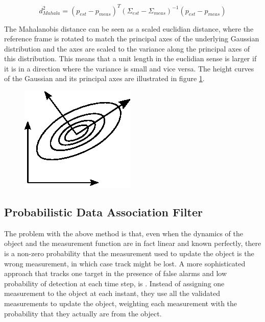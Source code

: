 \begin{equation}
    d^2_{Mahala} = (p_{est} - p_{meas})^T(\Sigma_{est} - \Sigma_{meas})^{-1}(p_{est} - p_{meas})
\end{equation}

The Mahalanobis distance can be seen as a scaled euclidian distance, where the reference frame is rotated to match the principal axes of the underlying Gaussian distribution and the axes are scaled to the variance along the principal axes of this distribution. This means that a unit length in the euclidian sense is larger if it is in a direction where the variance is small and vice versa. The height curves of the Gaussian and its principal axes are illustrated in figure \ref{Fig:GaussianPrincipalAxes}. 

\begin{figure}
    \centering
    \includegraphics[width=0.5\linewidth]{0_Images/3_Theory/GaussianPrincipalAxis.eps}
    \label{Fig:GaussianPrincipalAxes}
\end{figure}

\subsection{Probabilistic Data Association Filter}

The problem with the above method is that, even when the dynamics of the object and the measurement function are in fact linear and known perfectly, there is a non-zero probability that the measurement used to update the object is the wrong measurement, in which case track might be lost. A more sophisticated approach that tracks one target in the presence of false alarms and low probability of detection at each time step, is \cite{BarShalomPDA}. Instead of assigning one measurement to the object at each instant, they use all the validated measurements to update the object, weighting each measurement with the probability that they actually are from the object.  

